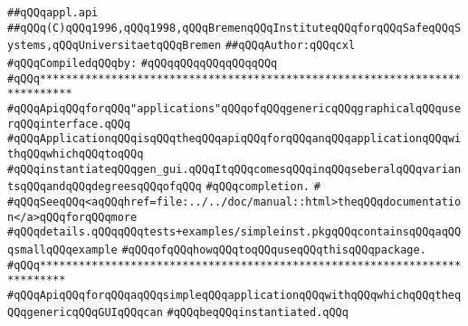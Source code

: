 \label{src/lib/tk/src/toolkit/appl.api}
\verb|##qQQqappl.api|\newline
\verb|##qQQq(C)qQQq1996,qQQq1998,qQQqBremenqQQqInstituteqQQqforqQQqSafeqQQqSystems,qQQqUniversitaetqQQqBremen|\newline
\verb|##qQQqAuthor:qQQqcxl|\newline
\newline
\verb|#qQQqCompiledqQQqby:|\newline
\verb|#qQQqqQQqqQQqqQQqqQQq|\newline
\newline
\newline
\newline
\verb|#qQQq***************************************************************************|\newline
\verb|#qQQqApiqQQqforqQQq"applications"qQQqofqQQqgenericqQQqgraphicalqQQquserqQQqinterface.qQQq|\newline
\verb|#qQQqApplicationqQQqisqQQqtheqQQqapiqQQqforqQQqanqQQqapplicationqQQqwithqQQqwhichqQQqtoqQQq|\newline
\verb|#qQQqinstantiateqQQqgen_gui.qQQqItqQQqcomesqQQqinqQQqseberalqQQqvariantsqQQqandqQQqdegreesqQQqofqQQq|\newline
\verb|#qQQqcompletion.|\newline
\verb|#|\newline
\verb|#qQQqSeeqQQq<aqQQqhref=file:../../doc/manual::html>theqQQqdocumentation</a>qQQqforqQQqmore|\newline
\verb|#qQQqdetails.qQQqqQQqtests+examples/simpleinst.pkgqQQqcontainsqQQqaqQQqsmallqQQqexample|\newline
\verb|#qQQqofqQQqhowqQQqtoqQQquseqQQqthisqQQqpackage.|\newline
\verb|#qQQq**************************************************************************|\newline
\newline
\newline
\newline
\newline
\newline
\newline
\verb|#qQQqApiqQQqforqQQqaqQQqsimpleqQQqapplicationqQQqwithqQQqwhichqQQqtheqQQqgenericqQQqGUIqQQqcan|\newline
\verb|#qQQqbeqQQqinstantiated.qQQq|\newline
\newline
